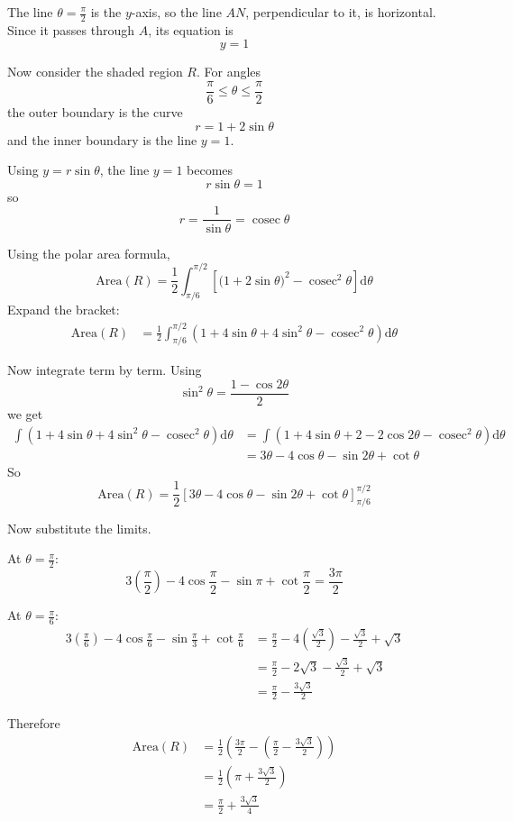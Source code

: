 \documentclass[leqno]{article}
\begin{document}
\begin{enumerate}[
	  label=\textbf{\arabic*.},
	  leftmargin=*,
	  topsep=0pt,
	  partopsep=0pt,
	  parsep=0pt
	]
\begin{tcolorbox}[colback=white, colframe=scarlet, title={\textbf{Solution}}, breakable, grow to left by=6mm, grow to right by=10mm]
	The line $\theta=\frac{\pi}{2}$ is the $y$-axis, so the line $AN$, perpendicular to it, is horizontal. Since it passes through $A$, its equation is
	\[
	y=1
	\]
	
	Now consider the shaded region $R$. For angles
	\[
	\frac{\pi}{6}\leq \theta \leq \frac{\pi}{2}
	\]
	the outer boundary is the curve
	\[
	r=1+2\sin\theta
	\]
	and the inner boundary is the line $y=1$.
	
	Using $y=r\sin\theta$, the line $y=1$ becomes
	\[
	r\sin\theta=1
	\]
	so
	\[
	r=\frac{1}{\sin\theta}=\operatorname{cosec}\theta
	\]
	
	Using the polar area formula,
	\[
	\text{Area}(R)=\frac12\int_{\pi/6}^{\pi/2}\left[\bigl(1+2\sin\theta\bigr)^2-\operatorname{cosec}^2\theta\right]\mathrm{d}\theta
	\]
	Expand the bracket:
	\begin{align*}
	\text{Area}(R)
	&=\frac12\int_{\pi/6}^{\pi/2}\left(1+4\sin\theta+4\sin^2\theta-\operatorname{cosec}^2\theta\right)\mathrm{d}\theta
	\end{align*}
	
	Now integrate term by term. Using
	\[
	\sin^2\theta=\frac{1-\cos 2\theta}{2}
	\]
	we get
	\begin{align*}
	\int \left(1+4\sin\theta+4\sin^2\theta-\operatorname{cosec}^2\theta\right)\mathrm{d}\theta
	&=\int \left(1+4\sin\theta+2-2\cos2\theta-\operatorname{cosec}^2\theta\right)\mathrm{d}\theta\\
	&=3\theta-4\cos\theta-\sin2\theta+\cot\theta
	\end{align*}
	So
	\[
	\text{Area}(R)=\frac12\left[3\theta-4\cos\theta-\sin2\theta+\cot\theta\right]_{\pi/6}^{\pi/2}
	\]
	
	Now substitute the limits.
	
	At $\theta=\frac{\pi}{2}$:
	\[
	3\left(\frac{\pi}{2}\right)-4\cos\frac{\pi}{2}-\sin\pi+\cot\frac{\pi}{2}
	=\frac{3\pi}{2}
	\]
	
	At $\theta=\frac{\pi}{6}$:
	\begin{align*}
	3\left(\frac{\pi}{6}\right)-4\cos\frac{\pi}{6}-\sin\frac{\pi}{3}+\cot\frac{\pi}{6}
	&=\frac{\pi}{2}-4\left(\frac{\sqrt3}{2}\right)-\frac{\sqrt3}{2}+\sqrt3\\
	&=\frac{\pi}{2}-2\sqrt3-\frac{\sqrt3}{2}+\sqrt3\\
	&=\frac{\pi}{2}-\frac{3\sqrt3}{2}
	\end{align*}
	
	Therefore
	\begin{align*}
	\text{Area}(R)
	&=\frac12\left(\frac{3\pi}{2}-\left(\frac{\pi}{2}-\frac{3\sqrt3}{2}\right)\right)\\
	&=\frac12\left(\pi+\frac{3\sqrt3}{2}\right)\\
	&=\frac{\pi}{2}+\frac{3\sqrt3}{4}
	\end{align*}
	

\end{tcolorbox}
\end{enumerate}
\end{document}
